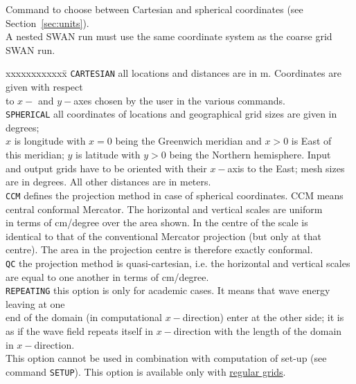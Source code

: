 \documentclass[12pt]{book}
\begin{document}
\noindent
Command to choose between Cartesian and spherical coordinates (see Section~\ref{sec:units}).
\\[2ex]
\noindent
A nested SWAN run must use the same coordinate system as the coarse grid SWAN run.
\begin{tabbing}
xxxxxxxxxxxx\= \kill
{\tt CARTESIAN} \> all locations and distances are in m. Coordinates are given with respect\+\\
                   to $x-$ and $y-$axes chosen by the user in the various commands.\-\\
{\tt SPHERICAL} \> all coordinates of locations and geographical grid sizes are given in degrees;\+\\
                   $x$ is longitude with $x=0$ being the Greenwich meridian and $x>0$ is East of\\
                   this meridian; $y$ is latitude with $y>0$ being the Northern hemisphere. Input\\
                   and output grids have to be oriented with their $x-$axis to the East; mesh sizes\\
                   are in degrees. All other distances are in meters.\-\\
{\tt CCM}       \> defines the projection method in case of spherical coordinates. CCM means\+\\
                   central conformal Mercator. The horizontal and vertical scales are uniform\\
                   in terms of cm/degree over the area shown. In the centre of the scale is\\
                   identical to that of the conventional Mercator projection (but only at that\\
                   centre). The area in the projection centre is therefore exactly conformal.\-\\
{\tt QC}        \> the projection method is quasi-cartesian, i.e. the horizontal and vertical scales\+\\
                   are equal to one another in terms of cm/degree.\-\\
{\tt REPEATING} \> this option is only for academic cases. It means that wave energy leaving at one\+\\
                   end of the domain (in computational $x-$direction) enter at the other side; it is\\
                   as if the wave field repeats itself in $x-$direction with the length of the domain\\
                   in $x-$direction.\\
                   This option cannot be used in combination with computation of set-up (see\\
                   command {\tt SETUP}). This option is available only with \underline{regular grids}.\-\\
\end{tabbing}
\end{document}
